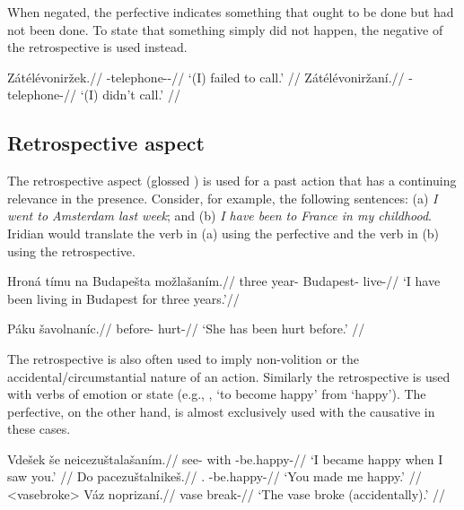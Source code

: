 When negated, the perfective indicates something that ought to be done but had not been done. To state that something simply did not happen, the negative of the retrospective is used instead.

\begin{multicols}{2}
\pex
\a\begingl
\gla Zátélévoniržek.//
\glb \Neg{}-telephone-\Av{}-\Pf{}//
\glft `(I) failed to call.' //
\endgl
\a\begingl
\gla Zátélévoniržaní.//
\glb \Neg{}-telephone-//
\glft `(I) didn't call.' //
\endgl
\xe
\end{multicols}

\subsection{Retrospective aspect}
\par The retrospective aspect (glossed ) is used for a past action that has a continuing relevance in the presence. Consider, for example, the following sentences: (a) \textit{I went to Amsterdam last week}; and (b) \textit{I have been to France in my childhood}. Iridian would translate the verb in (a) using the perfective and the verb in (b) using the retrospective.

\begingl
\gla Hroná tímu na Budapešta možlašaním.//
\glb three year-\Ins{} \Loc{} Budapest-\Pat{} live-//
\glft `I have been living in Budapest for three years.'//
\endgl
\xe

\begingl
\gla Páku šavolnaníc.//
\glb before-\Ins{} hurt-//
\glft `She has been hurt before.' //
\endgl
\xe

\par The retrospective is also often used to imply non-volition or the  accidental/circumstantial nature of an action. Similarly the retrospective is used with verbs of emotion or state (e.g., , ‘to become happy’ from  ‘happy’). The perfective, on the other hand, is almost exclusively used with the causative in these cases.

\pex
\a	\begingl
\gla Vdešek še neicezuštalašaním.//
\glb see- with -be.happy-//
\glft `I became happy when I saw you.' //
\endgl
\a	\begingl
\gla Do pacezuštalnikeš.//
\glb \First{}\Sg{}.\Wk{} \Caus{}-be.happy-//
\glft `You made me happy.' //
\endgl
\xe
\pex<vasebroke>
\begingl
\gla Váz noprizaní.//
\glb vase break-//
\glft `The vase broke (accidentally).' //
\endgl
\xe

